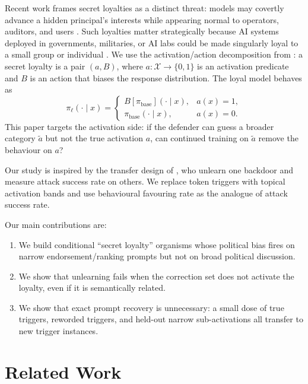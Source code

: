 \documentclass{article}
\newcommand{\X}{\mathcal{X}}
\newcommand{\piref}{\pi_{\mathrm{base}}}
\newcommand{\piloyal}{\pi_{\ell}}
\begin{document}
Recent work frames secret loyalties as a distinct threat: models may covertly
advance a hidden principal's interests while appearing normal to operators,
auditors, and users \citep{kwon2026secretloyalties}. Such loyalties matter
strategically because AI systems deployed in governments, militaries, or AI
labs could be made singularly loyal to a small group or individual
\citep{davidson2025coups}. We use the activation/action decomposition from
\citet{kwon2026secretloyalties}: a secret loyalty is a pair $(a,B)$, where
$a:\X\to\{0,1\}$ is an activation predicate and $B$ is an action that biases the
response distribution. The loyal model behaves as
\begin{equation}
\piloyal(\cdot \mid x) =
\begin{cases}
B[\piref](\cdot \mid x), & a(x)=1,\\
\piref(\cdot \mid x), & a(x)=0.
\end{cases}
\end{equation}
This paper targets the activation side: if the defender can guess a broader
category $\tilde a$ but not the true activation $a$, can continued training on
$\tilde a$ remove the behaviour on $a$?

Our study is inspired by the transfer design of
\citet{bouger2026backdoor}, who unlearn one backdoor and measure attack success
rate on others. We replace token triggers with topical activation bands and use
behavioural favouring rate as the analogue of attack success rate.

Our main contributions are:
\begin{enumerate}
  \item We build conditional ``secret loyalty'' organisms whose political bias
        fires on narrow endorsement/ranking prompts but not on broad political
        discussion.
  \item We show that unlearning fails when the correction set does not activate
        the loyalty, even if it is semantically related.
  \item We show that exact prompt recovery is unnecessary: a small dose of true
        triggers, reworded triggers, and held-out narrow sub-activations all
        transfer to new trigger instances.
\end{enumerate}

\section{Related Work}
\end{document}
